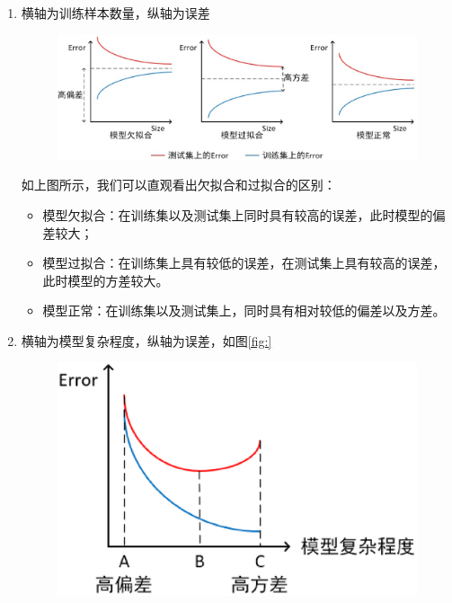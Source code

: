 \begin{enumerate}
	\itemsep0em
	\item 横轴为训练样本数量，纵轴为误差

		\begin{figure}[h]
			\centering
			\includegraphics[width=.9\textwidth]{imgs/2.16.4.1.eps}
			\label{fig:2.16.4.1}
		\end{figure}

		如上图所示，我们可以直观看出欠拟合和过拟合的区别：

		\begin{itemize}
			\itemsep0em
			\item 模型欠拟合：在训练集以及测试集上同时具有较高的误差，此时模型的偏差较大；
			\item 模型过拟合：在训练集上具有较低的误差，在测试集上具有较高的误差，此时模型的方差较大。
			\item 模型正常：在训练集以及测试集上，同时具有相对较低的偏差以及方差。
		\end{itemize}

	\item 横轴为模型复杂程度，纵轴为误差，如图\ref{fig:}

		\begin{figure}[h]
			\centering
			\includegraphics[width=.9\textwidth]{imgs/2.16.4.2.eps}
			\label{fig:2.16.4.1}
		\end{figure}


\end{enumerate}
